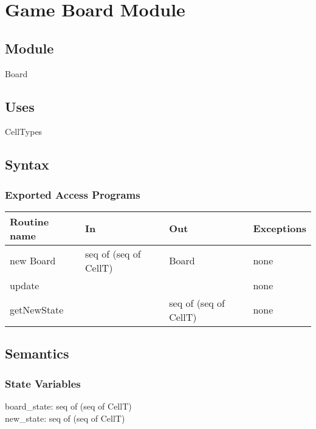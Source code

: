 \documentclass[12pt]{article}
\begin{document}
\newpage

\section* {Game Board Module}

\subsection*{Module}

Board

\subsection* {Uses}

\noindent CellTypes\\

\subsection* {Syntax}

\subsubsection* {Exported Access Programs}

\begin{tabular}{| l | l | l | l |}
\hline
\textbf{Routine name} & \textbf{In} & \textbf{Out} & \textbf{Exceptions}\\
\hline
new Board & seq of (seq of CellT) & Board & none\\
\hline
update & & & none\\
\hline
getNewState &  & seq of (seq of CellT) & none\\                                                          
\hline
\end{tabular}

\subsection* {Semantics}

\subsubsection* {State Variables}

board\_state: seq of (seq of CellT) \\
new\_state: seq of (seq of CellT) \\
\end{document}
